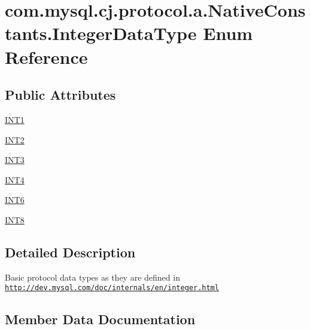 \hypertarget{enumcom_1_1mysql_1_1cj_1_1protocol_1_1a_1_1_native_constants_1_1_integer_data_type}{}\section{com.\+mysql.\+cj.\+protocol.\+a.\+Native\+Constants.\+Integer\+Data\+Type Enum Reference}
\label{enumcom_1_1mysql_1_1cj_1_1protocol_1_1a_1_1_native_constants_1_1_integer_data_type}
\subsection*{Public Attributes}
\begin{DoxyCompactItemize}
\item 
\mbox{\hyperlink{enumcom_1_1mysql_1_1cj_1_1protocol_1_1a_1_1_native_constants_1_1_integer_data_type_abac392da7db36a4480f3e537ec02eb7c}{I\+N\+T1}}
\item 
\mbox{\hyperlink{enumcom_1_1mysql_1_1cj_1_1protocol_1_1a_1_1_native_constants_1_1_integer_data_type_a39513e6d65a4bca3c8a785b36a6047fb}{I\+N\+T2}}
\item 
\mbox{\hyperlink{enumcom_1_1mysql_1_1cj_1_1protocol_1_1a_1_1_native_constants_1_1_integer_data_type_a77d18bc65d4f37fc2a372cb463234f95}{I\+N\+T3}}
\item 
\mbox{\hyperlink{enumcom_1_1mysql_1_1cj_1_1protocol_1_1a_1_1_native_constants_1_1_integer_data_type_af9f7142f73aa0c8a9aff37ff05d3df31}{I\+N\+T4}}
\item 
\mbox{\hyperlink{enumcom_1_1mysql_1_1cj_1_1protocol_1_1a_1_1_native_constants_1_1_integer_data_type_a2c85565f67caee5ac7aa90849e307a1a}{I\+N\+T6}}
\item 
\mbox{\hyperlink{enumcom_1_1mysql_1_1cj_1_1protocol_1_1a_1_1_native_constants_1_1_integer_data_type_a5a44ebdce68b97d5fc23418ce41bdd9d}{I\+N\+T8}}
\end{DoxyCompactItemize}


\subsection{Detailed Description}
Basic protocol data types as they are defined in \href{http://dev.mysql.com/doc/internals/en/integer.html}{\tt http\+://dev.\+mysql.\+com/doc/internals/en/integer.\+html} 

\subsection{Member Data Documentation}
\mbox{\label{enumcom_1_1mysql_1_1cj_1_1protocol_1_1a_1_1_native_constants_1_1_integer_data_type_abac392da7db36a4480f3e537ec02eb7c}} 
